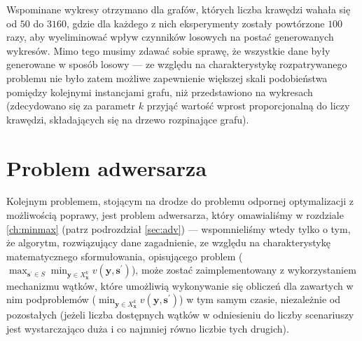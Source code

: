 Wspominane wykresy otrzymano dla grafów, których liczba krawędzi wahała się od $50$ do $3160$, gdzie dla każdego z nich eksperymenty zostały powtórzone $100$ razy, aby wyeliminować wpływ czynników losowych na postać generowanych wykresów. Mimo tego musimy zdawać sobie sprawę, że wszystkie dane były generowane w sposób losowy --- ze względu na charakterystykę rozpatrywanego problemu nie było zatem możliwe zapewnienie większej skali podobieństwa pomiędzy kolejnymi instancjami grafu, niż przedstawiono na wykresach (zdecydowano się za parametr $k$ przyjąć wartość wprost proporcjonalną do liczy krawędzi, składających się na drzewo rozpinające grafu).

\section{Problem adwersarza}

Kolejnym problemem, stojącym na drodze do problemu odpornej optymalizacji z możliwością poprawy, jest problem adwersarza, który omawialiśmy w rozdziale \ref{ch:minmax} (patrz podrozdział \ref{sec:adv}) --- wspomnieliśmy wtedy tylko o tym, że algorytm, rozwiązujący dane zagadnienie, ze względu na charakterystykę matematycznego sformułowania, opisującego problem ($\max_{\textbf{s}^{\prime} \in S} \min_{\textbf{y} \in X^{k}_{\textbf{x}}} v \left( \textbf{y}, \textbf{s}^{\prime} \right)$), może zostać zaimplementowany z wykorzystaniem mechanizmu wątków, które umożliwią wykonywanie się obliczeń dla zawartych w nim podproblemów ($\min_{\textbf{y} \in X^{k}_{\textbf{x}}} v \left( \textbf{y}, \textbf{s}^{\prime} \right)$) w tym samym czasie, niezależnie od pozostałych (jeżeli liczba dostępnych wątków w odniesieniu do liczby scenariuszy jest wystarczająco duża i co najmniej równo liczbie tych drugich). 

